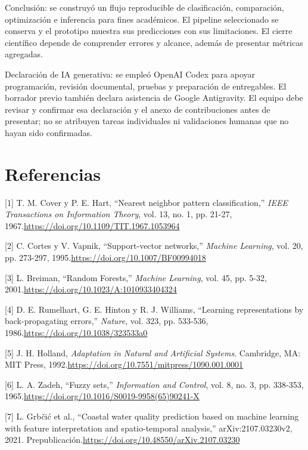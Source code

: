\documentclass[12pt,a4paper]{article}
\begin{document}
Conclusión: se construyó un flujo reproducible de clasificación, comparación, optimización e inferencia para fines académicos. El pipeline seleccionado se conserva y el prototipo muestra sus predicciones con sus limitaciones. El cierre científico depende de comprender errores y alcance, además de presentar métricas agregadas.

Declaración de IA generativa: se empleó OpenAI Codex para apoyar programación, revisión documental, pruebas y preparación de entregables. El borrador previo también declara asistencia de Google Antigravity. El equipo debe revisar y confirmar esa declaración y el anexo de contribuciones antes de presentar; no se atribuyen tareas individuales ni validaciones humanas que no hayan sido confirmadas.

\clearpage
\section*{Referencias}
[1] T. M. Cover y P. E. Hart, ``Nearest neighbor pattern classification,'' \textit{IEEE Transactions on Information Theory}, vol. 13, no. 1, pp. 21-27, 1967.\newline \url{https://doi.org/10.1109/TIT.1967.1053964}

[2] C. Cortes y V. Vapnik, ``Support-vector networks,'' \textit{Machine Learning}, vol. 20, pp. 273-297, 1995.\newline \url{https://doi.org/10.1007/BF00994018}

[3] L. Breiman, ``Random Forests,'' \textit{Machine Learning}, vol. 45, pp. 5-32, 2001.\newline \url{https://doi.org/10.1023/A:1010933404324}

[4] D. E. Rumelhart, G. E. Hinton y R. J. Williams, ``Learning representations by back-propagating errors,'' \textit{Nature}, vol. 323, pp. 533-536, 1986.\newline \url{https://doi.org/10.1038/323533a0}

[5] J. H. Holland, \textit{Adaptation in Natural and Artificial Systems}. Cambridge, MA: MIT Press, 1992.\newline \url{https://doi.org/10.7551/mitpress/1090.001.0001}

[6] L. A. Zadeh, ``Fuzzy sets,'' \textit{Information and Control}, vol. 8, no. 3, pp. 338-353, 1965.\newline \url{https://doi.org/10.1016/S0019-9958(65)90241-X}

[7] L. Grb\v{c}i\'{c} et al., ``Coastal water quality prediction based on machine learning with feature interpretation and spatio-temporal analysis,'' arXiv:2107.03230v2, 2021. Prepublicación.\newline \url{https://doi.org/10.48550/arXiv.2107.03230}
\end{document}
